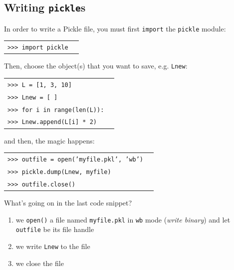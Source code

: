 \documentclass[t,handout,9pt]{beamer}
\begin{document}
\subsection{Writing \texttt{pickle}s}
\begin{frame}
\vfill
In order to write a Pickle file, you must first \texttt{import} the \texttt{pickle} module:
\begin{table}[]
\begin{flushleft}
\begin{tabular}{ll}
\texttt{>{}>{}> import pickle} &  \\
\end{tabular}
\end{flushleft}
\end{table}
Then, choose the object(s) that you want to save, e.g. \texttt{Lnew}:
\begin{table}[]
\begin{flushleft}
\begin{tabular}{ll}
\texttt{>{}>{}> L = [1, 3, 10]} &  \\
\texttt{>{}>{}> Lnew = [ ]} & \\
\texttt{>{}>{}> for i in range(len(L)):} &  \\
\texttt{>{}>{}> \qquad Lnew.append(L[i] * 2)} &  \\
\end{tabular}
\end{flushleft}
\end{table}
and then, the magic happens:
\begin{table}[]
\begin{flushleft}
\begin{tabular}{ll}
\texttt{>{}>{}> outfile = open('myfile.pkl', 'wb')} &  \\
\texttt{>{}>{}> pickle.dump(Lnew, myfile)} &  \\
\texttt{>{}>{}> outfile.close()} &  \\
\end{tabular}
\end{flushleft}
\end{table}
What's going on in the last code snippet?
\begin{enumerate}
	\item we \texttt{open()} a file named \texttt{myfile.pkl} in \texttt{wb} mode (\textit{write binary}) and let \texttt{outfile} be its file handle
	\item we write \texttt{Lnew} to the file
	\item we close the file
\end{enumerate}
\vfill
\end{frame}
\end{document}
